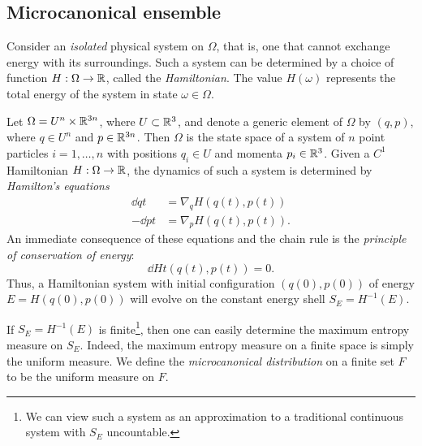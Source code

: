 \subsection{Microcanonical ensemble}

Consider an \emph{isolated} physical system on $\Omega$, that is, one that cannot exchange
energy with its surroundings. Such a system can be determined by a choice of function
$H : \Omega \rightarrow {\mathbb R}$, called the \emph{Hamiltonian}. The value $H(\omega)$ represents the
total energy of the system in state $\omega\in\Omega$.

\begin{example}
Let $\Omega = U^n \times {\mathbb R}^{3n}$, where $U \subset {\mathbb R}^3$, and denote a generic element of
$\Omega$ by $(q, p)$, where $q \in U^n$ and $p \in {\mathbb R}^{3n}$. Then $\Omega$ is the state
space of a system of $n$ point particles $i = 1, \ldots, n$ with positions $q_i \in U$
and momenta $p_i \in {\mathbb R}^3$. Given a $C^1$ Hamiltonian $H : \Omega \rightarrow {\mathbb R}$,
the dynamics of such a system is determined by \emph{Hamilton's equations}
\begin{align}
\dd{q}{t}   &= \nabla_q H(q(t), p(t)) \\
-\dd{p}{t}  &= \nabla_p H(q(t), p(t)).
\end{align}
An immediate consequence of these equations and the chain rule is the \emph{principle
of conservation of energy}:
\begin{equation}
\dd{H}{t}(q(t), p(t)) = 0.
\end{equation}
Thus, a Hamiltonian system with initial configuration $(q(0), p(0))$ of energy
$E = H(q(0), p(0))$ will evolve on the constant energy shell $S_E = H^{-1}(E)$.

\end{example}

If $S_E = H^{-1}(E)$ is finite\footnote{We can view such a system as an approximation
to a traditional continuous system with $S_E$ uncountable.}, then one can easily determine
the maximum entropy measure on $S_E$. Indeed, the maximum entropy measure on a finite
space is simply the uniform measure. We define the
\emph{microcanonical distribution} on a finite set $F$ to be the uniform
measure on $F$.

